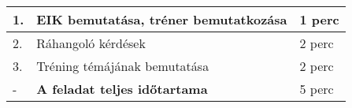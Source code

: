 \documentclass[../Main.tex]{subfiles}
\begin{document}
\begin{center}
    \begin{tabular}{| m{1.3 em} | m{} | m{} |}
    \hline
    1. & EIK bemutatása, tréner bemutatkozása & 1 perc \\
    \hline
    2. & Ráhangoló kérdések & 2 perc \\
    \hline
    3. & Tréning témájának bemutatása & 2 perc \\
    \hline
    - & \textbf{A feladat teljes időtartama} & 5 perc \\
    \hline
    \end{tabular}
\end{center}
\end{document}
